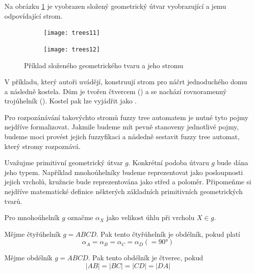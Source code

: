 \documentclass[a4paper,10pt]{article}
\begin{document}
\begin{example}
  Na obrázku \ref{img:Geoms} je vyobrazen složený geometrický útvar vyobrazující  a jemu odpovídající strom.
\end{example}

\begin{figure}[htp]
 \centering
 
 \begin{subfigure}{0.4\textwidth}
  \texttt{[image: trees11]}
 \end{subfigure}
 \begin{subfigure}{0.4\textwidth}
  \texttt{[image: trees12]}
 \end{subfigure}
 
 \caption{Příklad složeného geometrického tvaru a jeho stromu} \label{img:Geoms}
\end{figure}

V příkladu, který autoři uvádějí, konstruují strom pro náčrt jednoduchého domu a následně kostela. Dům je tvořen čtvercem () a  se nachází rovnoramenný trojúhelník (). Kostel pak lze vyjádřit jako .

Pro rozpozánávání takovýchto stromů fuzzy tree automatem je nutné tyto pojmy nejdříve formalizovat. Jakmile budeme mít pevně stanoveny jednotlivé pojmy, budeme moci provést jejich fuzzyfikaci a následně sestavit fuzzy tree automat, který stromy rozpoznává.

Uvažujme primitivní geometrický útvar $g$. Konkrétní podoba útvaru $g$ bude dána jeho typem. Například mnohoúhelníky budeme reprezentovat jako posloupnosti jejich vrcholů, kružncie bude reprezentována jako střed a poloměr. Připomeňme si nejdříve matematické definice některých základních primitivních geometrických tvarů. 

\begin{notation*}
 Pro mnohoúhelník $g$ označme $\alpha_X$ jako velikost úhlu při vrcholu $X \in g$.
\end{notation*}

\begin{definition}[Obdélník]
 Mějme čtyřúhelník $g = A B C D$. Pak tento čtyřúhelník je obdélník, pokud platí
 $$
  \alpha_A = \alpha_B = \alpha_C = \alpha_D ( = 90° )
 $$
\end{definition}

\begin{definition}[Čtverec]
 Mějme obdélník $g = A B C D$. Pak tento obdélník je čtverec, pokud
 $$
  |A B| = |B C| = |C D| = |D A|
 $$
\end{definition}
\end{document}
